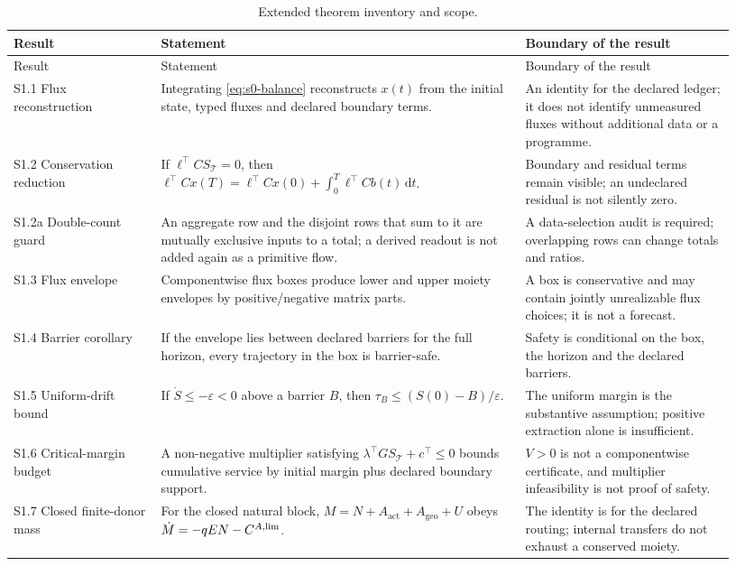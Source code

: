 \documentclass[11pt]{article}
\newcommand{\dd}{\,\mathrm{d}}
\begin{document}
\begin{longtable}{@{}P{0.19\linewidth}P{0.47\linewidth}P{0.27\linewidth}@{}}
\caption{Extended theorem inventory and scope.}\label{tab:inventory}\\
\toprule
Result & Statement & Boundary of the result \\
\midrule
\endfirsthead
\toprule
Result & Statement & Boundary of the result \\
\midrule
\endhead
\bottomrule
\endfoot
S1.1 Flux reconstruction & Integrating \eqref{eq:s0-balance} reconstructs $x(t)$ from the initial state, typed fluxes and declared boundary terms. & An identity for the declared ledger; it does not identify unmeasured fluxes without additional data or a programme. \\
S1.2 Conservation reduction & If $\ell^{\top}CS_{\mathcal T}=0$, then $\ell^{\top}Cx(T)=\ell^{\top}Cx(0)+\int_0^T\ell^{\top}Cb(t)\dd t$. & Boundary and residual terms remain visible; an undeclared residual is not silently zero. \\
S1.2a Double-count guard & An aggregate row and the disjoint rows that sum to it are mutually exclusive inputs to a total; a derived readout is not added again as a primitive flow. & A data-selection audit is required; overlapping rows can change totals and ratios. \\
S1.3 Flux envelope & Componentwise flux boxes produce lower and upper moiety envelopes by positive/negative matrix parts. & A box is conservative and may contain jointly unrealizable flux choices; it is not a forecast. \\
S1.4 Barrier corollary & If the envelope lies between declared barriers for the full horizon, every trajectory in the box is barrier-safe. & Safety is conditional on the box, the horizon and the declared barriers. \\
S1.5 Uniform-drift bound & If $\dot S\leq-\varepsilon<0$ above a barrier $B$, then $\tau_B\leq(S(0)-B)/\varepsilon$. & The uniform margin is the substantive assumption; positive extraction alone is insufficient. \\
S1.6 Critical-margin budget & A non-negative multiplier satisfying $\lambda^{\top}GS_{\mathcal T}+c^{\top}\leq0$ bounds cumulative service by initial margin plus declared boundary support. & $V>0$ is not a componentwise certificate, and multiplier infeasibility is not proof of safety. \\
S1.7 Closed finite-donor mass & For the closed natural block, $M=N+A_{\mathrm{act}}+A_{\mathrm{geo}}+U$ obeys $\dot M=-qEN-C^{A,\rm lim}$. & The identity is for the declared routing; internal transfers do not exhaust a conserved moiety. \\

\end{longtable}
\end{document}
